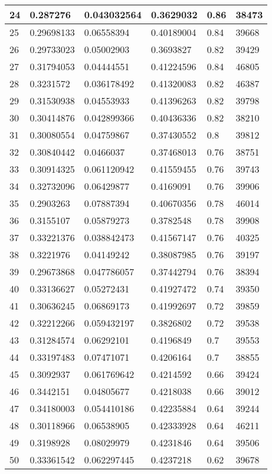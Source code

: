 \begin{longtable}{|l|l|l|l|l|l|}
24 & 0.287276 & 0.043032564 & 0.3629032 & 0.86 & 38473 \\ \hline 
25 & 0.29698133 & 0.06558394 & 0.40189004 & 0.84 & 39668 \\ \hline 
26 & 0.29733023 & 0.05002903 & 0.3693827 & 0.82 & 39429 \\ \hline 
27 & 0.31794053 & 0.04444551 & 0.41224596 & 0.84 & 46805 \\ \hline 
28 & 0.3231572 & 0.036178492 & 0.41320083 & 0.82 & 46387 \\ \hline 
29 & 0.31530938 & 0.04553933 & 0.41396263 & 0.82 & 39798 \\ \hline 
30 & 0.30414876 & 0.042899366 & 0.40436336 & 0.82 & 38210 \\ \hline 
31 & 0.30080554 & 0.04759867 & 0.37430552 & 0.8 & 39812 \\ \hline 
32 & 0.30840442 & 0.0466037 & 0.37468013 & 0.76 & 38751 \\ \hline 
33 & 0.30914325 & 0.061120942 & 0.41559455 & 0.76 & 39743 \\ \hline 
34 & 0.32732096 & 0.06429877 & 0.4169091 & 0.76 & 39906 \\ \hline 
35 & 0.2903263 & 0.07887394 & 0.40670356 & 0.78 & 46014 \\ \hline 
36 & 0.3155107 & 0.05879273 & 0.3782548 & 0.78 & 39908 \\ \hline 
37 & 0.33221376 & 0.038842473 & 0.41567147 & 0.76 & 40325 \\ \hline 
38 & 0.3221976 & 0.04149242 & 0.38087985 & 0.76 & 39197 \\ \hline 
39 & 0.29673868 & 0.047786057 & 0.37442794 & 0.76 & 38394 \\ \hline 
40 & 0.33136627 & 0.05272431 & 0.41927472 & 0.74 & 39350 \\ \hline 
41 & 0.30636245 & 0.06869173 & 0.41992697 & 0.72 & 39859 \\ \hline 
42 & 0.32212266 & 0.059432197 & 0.3826802 & 0.72 & 39538 \\ \hline 
43 & 0.31284574 & 0.06292101 & 0.4196849 & 0.7 & 39553 \\ \hline 
44 & 0.33197483 & 0.07471071 & 0.4206164 & 0.7 & 38855 \\ \hline 
45 & 0.3092937 & 0.061769642 & 0.4214592 & 0.66 & 39424 \\ \hline 
46 & 0.3442151 & 0.04805677 & 0.4218038 & 0.66 & 39012 \\ \hline 
47 & 0.34180003 & 0.054410186 & 0.42235884 & 0.64 & 39244 \\ \hline 
48 & 0.30118966 & 0.06538905 & 0.42333928 & 0.64 & 46211 \\ \hline 
49 & 0.3198928 & 0.08029979 & 0.4231846 & 0.64 & 39506 \\ \hline 
50 & 0.33361542 & 0.062297445 & 0.4237218 & 0.62 & 39678 \\ \hline 
\end{longtable}